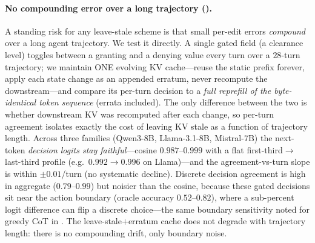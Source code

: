\paragraph{No compounding error over a long trajectory ().} A standing risk for any
leave-stale scheme is that small per-edit errors \emph{compound} over a long agent trajectory. We test it
directly. A single gated field (a clearance level) toggles between a granting and a denying value every turn
over a $28$-turn trajectory; we maintain ONE evolving KV cache---reuse the static prefix forever, apply each
state change as an appended erratum, never recompute the downstream---and compare its per-turn decision to a
\emph{full reprefill of the byte-identical token sequence} (errata included). The only difference between the
two is whether downstream KV was recomputed after each change, so per-turn agreement isolates exactly the
cost of leaving KV stale as a function of trajectory length. Across three families (Qwen3-8B, Llama-3.1-8B,
Mistral-7B) the next-token \emph{decision logits stay faithful}---cosine $0.987$--$0.999$ with a flat
first-third$\to$last-third profile (e.g.\ $0.992\to0.996$ on Llama)---and the agreement-vs-turn slope is
within $\pm0.01$/turn (no systematic decline). Discrete decision agreement is high in aggregate
($0.79$--$0.99$) but noisier than the cosine, because these gated decisions sit near the action boundary
(oracle accuracy $0.52$--$0.82$), where a sub-percent logit difference can flip a discrete choice---the same
boundary sensitivity noted for greedy CoT in . The leave-stale$+$erratum cache does not
degrade with trajectory length: there is no compounding drift, only boundary noise.

